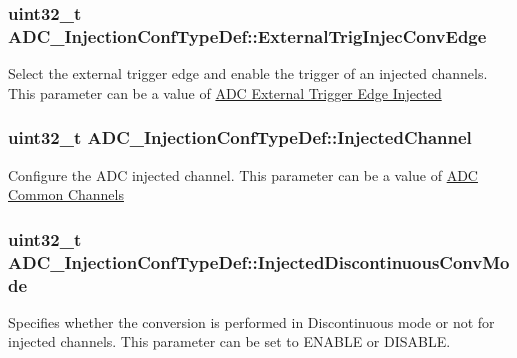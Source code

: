 \subsubsection[{\texorpdfstring{External\+Trig\+Injec\+Conv\+Edge}{ExternalTrigInjecConvEdge}}]{\setlength{\rightskip}{0pt plus 5cm}uint32\+\_\+t A\+D\+C\+\_\+\+Injection\+Conf\+Type\+Def\+::\+External\+Trig\+Injec\+Conv\+Edge}\hypertarget{struct_a_d_c___injection_conf_type_def_a4f2cfa808b5ace1e47fc3f94da7b850f}{}\label{struct_a_d_c___injection_conf_type_def_a4f2cfa808b5ace1e47fc3f94da7b850f}
Select the external trigger edge and enable the trigger of an injected channels. This parameter can be a value of \hyperlink{group___a_d_c_ex___external__trigger__edge___injected}{A\+DC External Trigger Edge Injected} 
\subsubsection[{\texorpdfstring{Injected\+Channel}{InjectedChannel}}]{\setlength{\rightskip}{0pt plus 5cm}uint32\+\_\+t A\+D\+C\+\_\+\+Injection\+Conf\+Type\+Def\+::\+Injected\+Channel}\hypertarget{struct_a_d_c___injection_conf_type_def_aad0cab6ed3f66e8ffa4bd0490298b715}{}\label{struct_a_d_c___injection_conf_type_def_aad0cab6ed3f66e8ffa4bd0490298b715}
Configure the A\+DC injected channel. This parameter can be a value of \hyperlink{group___a_d_c__channels}{A\+DC Common Channels} 
\subsubsection[{\texorpdfstring{Injected\+Discontinuous\+Conv\+Mode}{InjectedDiscontinuousConvMode}}]{\setlength{\rightskip}{0pt plus 5cm}uint32\+\_\+t A\+D\+C\+\_\+\+Injection\+Conf\+Type\+Def\+::\+Injected\+Discontinuous\+Conv\+Mode}\hypertarget{struct_a_d_c___injection_conf_type_def_adf871acec9ab869d14b5d58e1549739b}{}\label{struct_a_d_c___injection_conf_type_def_adf871acec9ab869d14b5d58e1549739b}
Specifies whether the conversion is performed in Discontinuous mode or not for injected channels. This parameter can be set to E\+N\+A\+B\+LE or D\+I\+S\+A\+B\+LE. 
